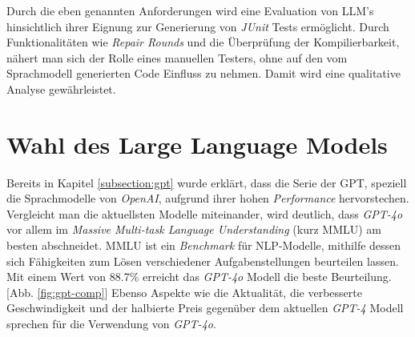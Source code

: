 Durch die eben genannten Anforderungen wird eine Evaluation von LLM's hinsichtlich ihrer Eignung zur Generierung von \textit{JUnit} Tests ermöglicht. Durch Funktionalitäten wie \textit{Repair Rounds} und die Überprüfung der Kompilierbarkeit, nähert man sich der Rolle eines manuellen Testers, ohne auf den vom Sprachmodell generierten Code Einfluss zu nehmen. Damit wird eine qualitative Analyse gewährleistet.

\section{Wahl des Large Language Models}
Bereits in Kapitel \ref{subsection:gpt} wurde erklärt, dass die Serie der GPT, speziell die Sprachmodelle von \textit{OpenAI}, aufgrund ihrer hohen \textit{Performance} hervorstechen. Vergleicht man die aktuellsten Modelle miteinander, wird deutlich, dass \textit{GPT-4o} vor allem im \textit{Massive Multi-task Language Understanding} (kurz MMLU) am besten abschneidet. \acs{MMLU} ist ein \textit{Benchmark} für NLP-Modelle, mithilfe dessen sich Fähigkeiten zum Lösen verschiedener Aufgabenstellungen beurteilen lassen. Mit einem Wert von 88.7\% erreicht das \textit{GPT-4o} Modell die beste Beurteilung. [Abb. \ref{fig:gpt-comp}] \cite{HelloGPT4o} Ebenso Aspekte wie die Aktualität, die verbesserte Geschwindigkeit und der halbierte Preis gegenüber dem aktuellen \textit{GPT-4} Modell sprechen für die Verwendung von \textit{GPT-4o}. \cite{HelloGPT4o} 

